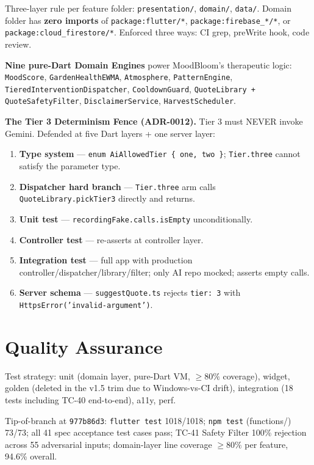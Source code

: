 \documentclass[11pt,a4paper]{article}
\begin{document}
Three-layer rule per feature folder: \texttt{presentation/},
\texttt{domain/}, \texttt{data/}. Domain folder has \textbf{zero
imports} of \texttt{package:flutter/*},
\texttt{package:firebase\_*/*}, or
\texttt{package:cloud\_firestore/*}. Enforced three ways: CI grep,
preWrite hook, code review.

\textbf{Nine pure-Dart Domain Engines} power MoodBloom's therapeutic
logic: \texttt{MoodScore}, \texttt{GardenHealthEWMA},
\texttt{Atmosphere}, \texttt{PatternEngine},
\texttt{TieredInterventionDispatcher}, \texttt{CooldownGuard},
\texttt{QuoteLibrary + QuoteSafetyFilter}, \texttt{DisclaimerService},
\texttt{HarvestScheduler}.

\textbf{The Tier 3 Determinism Fence (ADR-0012).} Tier 3 must NEVER
invoke Gemini. Defended at five Dart layers + one server layer:

\begin{enumerate}[leftmargin=*]
\item \textbf{Type system} --- \texttt{enum AiAllowedTier \{ one, two \}}; \texttt{Tier.three} cannot satisfy the parameter type.
\item \textbf{Dispatcher hard branch} --- \texttt{Tier.three} arm calls \texttt{QuoteLibrary.pickTier3} directly and returns.
\item \textbf{Unit test} --- \texttt{recordingFake.calls.isEmpty} unconditionally.
\item \textbf{Controller test} --- re-asserts at controller layer.
\item \textbf{Integration test} --- full app with production controller/dispatcher/library/filter; only AI repo mocked; asserts empty calls.
\item \textbf{Server schema} --- \texttt{suggestQuote.ts} rejects \texttt{tier: 3} with \texttt{HttpsError('invalid-argument')}.
\end{enumerate}

\section{Quality Assurance}

Test strategy: unit (domain layer, pure-Dart VM, $\geq 80\%$ coverage),
widget, golden (deleted in the v1.5 trim due to Windows-vs-CI drift),
integration (18 tests including TC-40 end-to-end), a11y, perf.

Tip-of-branch at \texttt{977b86d3}: \texttt{flutter test} 1018/1018;
\texttt{npm test} (functions/) 73/73; all 41 spec acceptance test cases
pass; TC-41 Safety Filter 100\% rejection across 55 adversarial inputs;
domain-layer line coverage $\geq 80\%$ per feature, 94.6\% overall.
\end{document}
